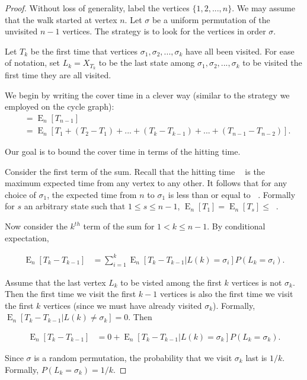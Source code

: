 \documentclass[12pt]{article}
\theoremstyle{definition}
\DeclareMathOperator{\E}{\mathrm{E}}		     %
\DeclareMathOperator{\tcov}{t_\textrm{cov}}      %
\DeclareMathOperator{\hit}{t_{\textrm{hit}}}     %
\begin{document}
\begin{proof}
Without loss of generality, label the vertices $\{1, 2, ..., n\}$.
We may assume that the walk started at vertex $n$.
Let $\sigma$ be a uniform permutation of the unvisited $n-1$ vertices.
The strategy is to look for the vertices in order $\sigma$.

Let $T_k$ be the first time that vertices $\sigma_1, \sigma_2, ..., \sigma_k$
have all been visited.
For ease of notation, set $L_k = X_{T_k}$ to be the last state among 
$\sigma_1, \sigma_2, ..., \sigma_k$ to be visited the first
time they are all visited.

We begin by writing the cover time in a clever way
(similar to the strategy we employed on the cycle graph):
\begin{align}
\tcov &= \E_n[{T_{n-1}}]  \nonumber \\
&= \E_n[T_1 + (T_2 - T_1) + ... + 
(T_k - T_{k-1}) + ... + (T_{n-1} - T_{n-2})] . \nonumber
\end{align}

Our goal is to bound the cover time in terms of the hitting time.

Consider the first term of the sum.
Recall that the hitting time $\hit$ is the maximum
expected time from any vertex to any other.
It follows that for any choice of $\sigma_1$,
the expected time from $n$ to $\sigma_1$ is less than or equal to $\hit$.
Formally for $s$ an arbitrary state such that $1\leq s \leq n-1$,
$\E_n[T_1] = \E_n[T_s] \leq \hit$.

Now consider the $k^{th}$ term of the sum for $1 < k \leq n-1$.
By conditional expectation,

\begin{align}
\E_n[T_k - T_{k-1}] &=
\sum_{i=1}^k \E_n[T_k - T_{k-1} | L(k) = \sigma_i]
P(L_k = \sigma_i). \nonumber 
\end{align}

Assume that the last vertex $L_k$ to be visted among the first
$k$ vertices is not $\sigma_k$.
Then the first time we visit the first $k-1$ vertices
is also the first time we visit the first $k$ vertices
(since we must have already visited $\sigma_k$).
Formally, $\E_n[T_k-T_{k-1}|L(k) \neq \sigma_k] = 0$.
Then 

\begin{align}
\E_n[T_k - T_{k-1}] &= 0 +
\E_n[T_k - T_{k-1} | L(k) = \sigma_k]
P(L_k = \sigma_k). \nonumber 
\end{align}

Since $\sigma$ is a random permutation, the probability that
we visit $\sigma_k$ last is $1/k$.
Formally, $P(L_k = \sigma_k) = 1/k$.


\end{proof}
\end{document}
